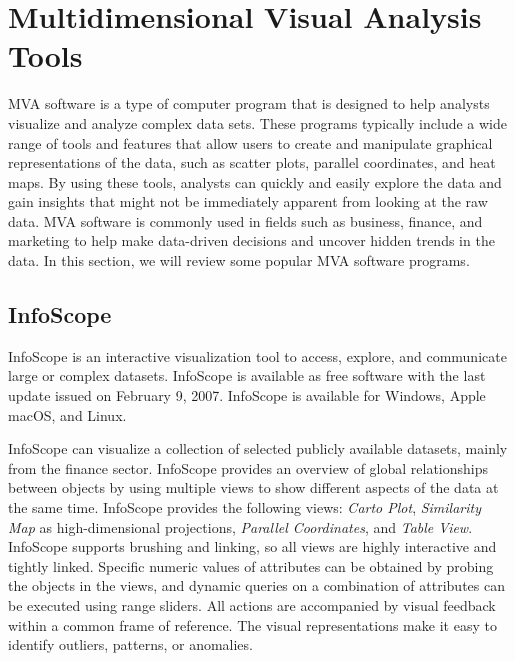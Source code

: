 
\chapter{Multidimensional Visual Analysis Tools}

\label{chap:MVATools}

MVA software is a type of computer program that is designed to help
analysts visualize and analyze complex data sets. These programs
typically include a wide range of tools and features that allow users
to create and manipulate graphical representations of the data, such
as scatter plots, parallel coordinates, and heat maps. By using these
tools, analysts can quickly and easily explore the data and gain
insights that might not be immediately apparent from looking at the
raw data. MVA software is commonly used in fields such as business,
finance, and marketing to help make data-driven decisions and uncover
hidden trends in the data. In this section, we will review some
popular MVA software programs.




\section{InfoScope}

InfoScope \parencite{InfoScope} is an interactive visualization tool
to access, explore, and communicate large or complex
datasets. InfoScope is available as free software with the last update
issued on February 9, 2007. InfoScope is available for Windows, Apple
macOS, and Linux.

InfoScope can visualize a collection of selected publicly available
datasets, mainly from the finance sector. InfoScope provides an
overview of global relationships between objects by using multiple
views to show different aspects of the data at the same
time. InfoScope provides the following views: \emph{Carto Plot},
\emph{Similarity Map} as high-dimensional projections, \emph{Parallel
Coordinates}, and \emph{Table View}. InfoScope supports brushing and
linking, so all views are highly interactive and tightly
linked. Specific numeric values of attributes can be obtained by
probing the objects in the views, and dynamic queries on a combination
of attributes can be executed using range sliders. All actions are
accompanied by visual feedback within a common frame of reference. The
visual representations make it easy to identify outliers, patterns, or
anomalies.



